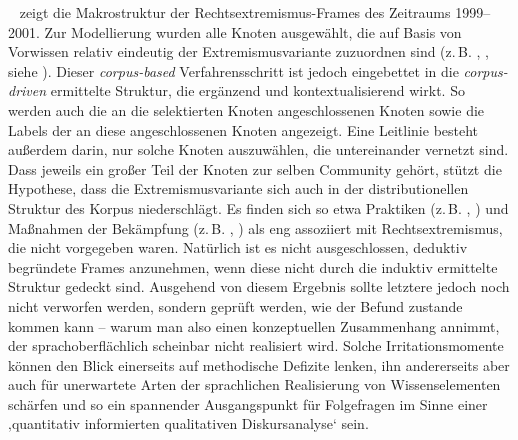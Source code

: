 ~ zeigt die Makrostruktur der Rechtsextremismus-Frames des Zeitraums 1999--2001. Zur Modellierung wurden alle Knoten ausgewählt, die auf Basis von Vorwissen relativ eindeutig der Extremismusvariante zuzuordnen sind (z.\,B. , , siehe ). Dieser \emph{corpus-based} Verfahrensschritt ist jedoch eingebettet in die \emph{corpus-driven} ermittelte Struktur, die ergänzend und kontextualisierend wirkt. So werden auch die an die selektierten Knoten angeschlossenen Knoten sowie die Labels der an diese angeschlossenen Knoten angezeigt. Eine Leitlinie besteht außerdem darin, nur solche Knoten auszuwählen, die untereinander vernetzt sind. Dass jeweils ein großer Teil der Knoten zur selben Community gehört, stützt die Hypothese, dass die Extremismusvariante sich auch in der distributionellen Struktur des Korpus niederschlägt. Es finden sich so etwa Praktiken (z.\,B. , ) und Maßnahmen der Bekämpfung (z.\,B. , ) als eng assoziiert mit Rechtsextremismus, die nicht vorgegeben waren. Natürlich ist es nicht ausgeschlossen, deduktiv begründete Frames anzunehmen, wenn diese nicht durch die induktiv ermittelte Struktur gedeckt sind. Ausgehend von diesem Ergebnis sollte letztere jedoch noch nicht verworfen werden, sondern geprüft werden, wie der Befund zustande kommen kann -- warum man also einen konzeptuellen Zusammenhang annimmt, der sprachoberflächlich scheinbar nicht realisiert wird. Solche Irritationsmomente können den Blick einerseits auf methodische Defizite lenken, ihn andererseits aber auch für unerwartete Arten der sprachlichen Realisierung von Wissenselementen schärfen und so ein spannender Ausgangspunkt für Folgefragen im Sinne einer ‚quantitativ informierten qualitativen Diskursanalyse` \autocite{bubenhoferQuantitativInformierteQualitative2013} sein.

